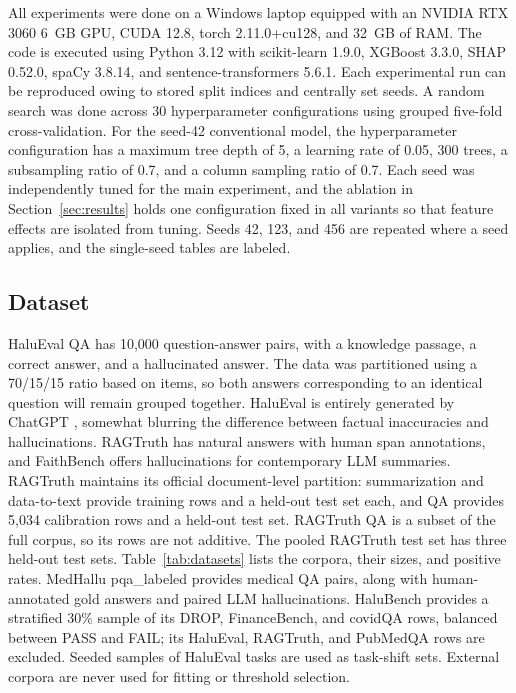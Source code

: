 \documentclass[a4paper,fleqn]{cas-sc}
\begin{document}
All experiments were done on a Windows laptop equipped with an NVIDIA RTX 3060 6~GB GPU, CUDA 12.8, torch 2.11.0+cu128, and 32~GB of RAM. The code is executed using Python 3.12 with scikit-learn 1.9.0, XGBoost 3.3.0, SHAP 0.52.0, spaCy 3.8.14, and sentence-transformers 5.6.1. Each experimental run can be reproduced owing to stored split indices and centrally set seeds. A random search was done across 30 hyperparameter configurations using grouped five-fold cross-validation. For the seed-42 conventional model, the hyperparameter configuration has a maximum tree depth of 5, a learning rate of 0.05, 300 trees, a subsampling ratio of 0.7, and a column sampling ratio of 0.7. Each seed was independently tuned for the main experiment, and the ablation in Section~\ref{sec:results} holds one configuration fixed in all variants so that feature effects are isolated from tuning. Seeds 42, 123, and 456 are repeated where a seed applies, and the single-seed tables are labeled.

\subsection{Dataset}

HaluEval QA \cite{haluEval} has 10{,}000 question-answer pairs, with a knowledge passage, a correct answer, and a hallucinated answer. The data was partitioned using a 70/15/15 ratio based on items, so both answers corresponding to an identical question will remain grouped together. HaluEval is entirely generated by ChatGPT \cite{haluEval,bang-etal-2025-hallulens}, somewhat blurring the difference between factual inaccuracies and hallucinations. RAGTruth \cite{ragtruth} has natural answers with human span annotations, and FaithBench \cite{faithbench} offers hallucinations for contemporary LLM summaries. RAGTruth maintains its official document-level partition: summarization and data-to-text provide training rows and a held-out test set each, and QA provides 5{,}034 calibration rows and a held-out test set. RAGTruth QA is a subset of the full corpus, so its rows are not additive. The pooled RAGTruth test set has three held-out test sets. Table~\ref{tab:datasets} lists the corpora, their sizes, and positive rates. MedHallu pqa\_labeled \cite{pandit2025medhallu} provides medical QA pairs, along with human-annotated gold answers and paired LLM hallucinations. HaluBench \cite{ravi2024lynx} provides a stratified 30\% sample of its DROP, FinanceBench, and covidQA rows, balanced between PASS and FAIL; its HaluEval, RAGTruth, and PubMedQA rows are excluded. Seeded samples of HaluEval tasks are used as task-shift sets. External corpora are never used for fitting or threshold selection.
\end{document}
